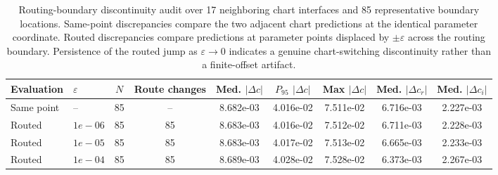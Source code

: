 \begin{table}[t]
\centering
\caption{
Routing-boundary discontinuity audit over 17 neighboring chart interfaces
and 85 representative boundary locations. Same-point discrepancies compare
the two adjacent chart predictions at the identical parameter coordinate.
Routed discrepancies compare predictions at parameter points displaced by
$\pm\varepsilon$ across the routing boundary. Persistence of the routed
jump as $\varepsilon\rightarrow0$ indicates a genuine chart-switching
discontinuity rather than a finite-offset artifact.
}
\label{tab:routing_boundary_summary}
\small
\setlength{\tabcolsep}{4.2pt}
\begin{tabular}{llccccccc}
\toprule
Evaluation
& $\varepsilon$
& $N$
& Route changes
& Med. $|\Delta c|$
& $P_{95}$ $|\Delta c|$
& Max $|\Delta c|$
& Med. $|\Delta c_r|$
& Med. $|\Delta c_i|$ \\
\midrule
Same point & -- & 85 & -- & 8.682e-03 & 4.016e-02 & 7.511e-02 & 6.716e-03 & 2.227e-03 \\
\midrule
Routed & $1e-06$ & 85 & 85 & 8.683e-03 & 4.016e-02 & 7.512e-02 & 6.711e-03 & 2.228e-03 \\
Routed & $1e-05$ & 85 & 85 & 8.683e-03 & 4.017e-02 & 7.513e-02 & 6.665e-03 & 2.233e-03 \\
Routed & $1e-04$ & 85 & 85 & 8.689e-03 & 4.028e-02 & 7.528e-02 & 6.373e-03 & 2.267e-03 \\
\bottomrule
\end{tabular}
\end{table}
